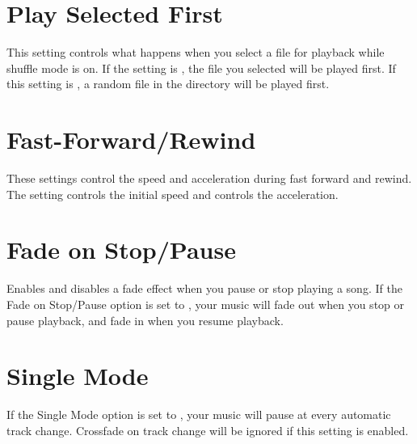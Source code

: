 \section{Play Selected First}
  This setting controls what happens when you
  select a file for playback while shuffle mode is on. If the
   setting is , the file you
  selected will be played first. If this setting is , a random
  file in the directory will be played first.

\section{Fast-Forward/Rewind}
  These settings control the speed and acceleration during fast forward and rewind.
  The setting  controls the initial speed and  controls the acceleration.


\section{Fade on Stop/Pause}
  Enables and disables a fade effect when you
  pause or stop playing a song. If the Fade on Stop/Pause option is
  set to , your music will fade out when you stop or pause 
  playback, and fade in when you resume playback.
    
\section{Single Mode}
  If the Single Mode  option is  set to , your music
  will pause at every automatic track change. Crossfade on track
  change will be ignored if this setting is enabled.

